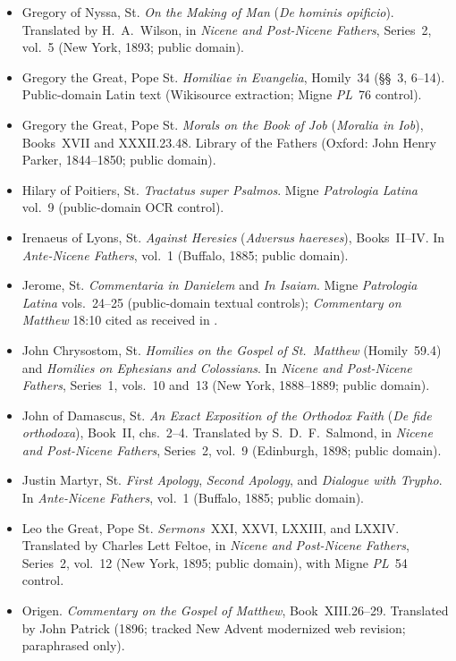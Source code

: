 \begin{itemize}
\item Gregory of Nyssa, St. \emph{On the Making of Man} (\emph{De hominis opificio}). Translated by H.~A.~Wilson, in \emph{Nicene and Post-Nicene Fathers}, Series~2, vol.~5 (New York, 1893; public domain).
\item Gregory the Great, Pope St. \emph{Homiliae in Evangelia}, Homily~34 (\S\S~3, 6--14). Public-domain Latin text (Wikisource extraction; Migne \emph{PL}~76 control).
\item Gregory the Great, Pope St. \emph{Morals on the Book of Job} (\emph{Moralia in Iob}), Books~XVII and XXXII.23.48. Library of the Fathers (Oxford: John Henry Parker, 1844--1850; public domain).
\item Hilary of Poitiers, St. \emph{Tractatus super Psalmos}. Migne \emph{Patrologia Latina} vol.~9 (public-domain OCR control).
\item Irenaeus of Lyons, St. \emph{Against Heresies} (\emph{Adversus haereses}), Books~II--IV. In \emph{Ante-Nicene Fathers}, vol.~1 (Buffalo, 1885; public domain).
\item Jerome, St. \emph{Commentaria in Danielem} and \emph{In Isaiam}. Migne \emph{Patrologia Latina} vols.~24--25 (public-domain textual controls); \emph{Commentary on Matthew} 18:10 cited as received in .
\item John Chrysostom, St. \emph{Homilies on the Gospel of St.~Matthew} (Homily~59.4) and \emph{Homilies on Ephesians and Colossians}. In \emph{Nicene and Post-Nicene Fathers}, Series~1, vols.~10 and~13 (New York, 1888--1889; public domain).
\item John of Damascus, St. \emph{An Exact Exposition of the Orthodox Faith} (\emph{De fide orthodoxa}), Book~II, chs.~2--4. Translated by S.~D.~F.~Salmond, in \emph{Nicene and Post-Nicene Fathers}, Series~2, vol.~9 (Edinburgh, 1898; public domain).
\item Justin Martyr, St. \emph{First Apology}, \emph{Second Apology}, and \emph{Dialogue with Trypho}. In \emph{Ante-Nicene Fathers}, vol.~1 (Buffalo, 1885; public domain).
\item Leo the Great, Pope St. \emph{Sermons}~XXI, XXVI, LXXIII, and LXXIV. Translated by Charles Lett Feltoe, in \emph{Nicene and Post-Nicene Fathers}, Series~2, vol.~12 (New York, 1895; public domain), with Migne \emph{PL}~54 control.
\item Origen. \emph{Commentary on the Gospel of Matthew}, Book~XIII.26--29. Translated by John Patrick (1896; tracked New Advent modernized web revision; paraphrased only).
\end{itemize}

